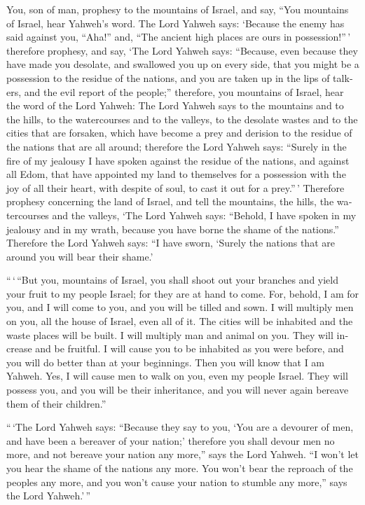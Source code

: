 \begin{paracol}{2}
\begin{otherlanguage}{english}
 You, son of man, prophesy to the mountains of Israel, and
say, ``You mountains of Israel, hear Yahweh's word.  The
Lord Yahweh says: `Because the enemy has said against you, ``Aha!'' and,
``The ancient high places are ours in possession!''\,' 
therefore prophesy, and say, `The Lord Yahweh says: ``Because, even
because they have made you desolate, and swallowed you up on every side,
that you might be a possession to the residue of the nations, and you
are taken up in the lips of talkers, and the evil report of the
people;''  therefore, you mountains of Israel, hear the
word of the Lord Yahweh: The Lord Yahweh says to the mountains and to
the hills, to the watercourses and to the valleys, to the desolate
wastes and to the cities that are forsaken, which have become a prey and
derision to the residue of the nations that are all around;
 therefore the Lord Yahweh says: ``Surely in the fire of
my jealousy I have spoken against the residue of the nations, and
against all Edom, that have appointed my land to themselves for a
possession with the joy of all their heart, with despite of soul, to
cast it out for a prey.''\,'  Therefore prophesy
concerning the land of Israel, and tell the mountains, the hills, the
watercourses and the valleys, `The Lord Yahweh says: ``Behold, I have
spoken in my jealousy and in my wrath, because you have borne the shame
of the nations.''  Therefore the Lord Yahweh says: ``I
have sworn, `Surely the nations that are around you will bear their
shame.'

 ``\,`\,``But you, mountains of Israel, you shall shoot
out your branches and yield your fruit to my people Israel; for they are
at hand to come.  For, behold, I am for you, and I will
come to you, and you will be tilled and sown.  I will
multiply men on you, all the house of Israel, even all of it. The cities
will be inhabited and the waste places will be built.  I
will multiply man and animal on you. They will increase and be fruitful.
I will cause you to be inhabited as you were before, and you will do
better than at your beginnings. Then you will know that I am Yahweh.
 Yes, I will cause men to walk on you, even my people
Israel. They will possess you, and you will be their inheritance, and
you will never again bereave them of their children.''

 ``\,`The Lord Yahweh says: ``Because they say to you,
`You are a devourer of men, and have been a bereaver of your nation;'
 therefore you shall devour men no more, and not bereave
your nation any more,'' says the Lord Yahweh.  ``I won't
let you hear the shame of the nations any more. You won't bear the
reproach of the peoples any more, and you won't cause your nation to
stumble any more,'' says the Lord Yahweh.'\,''


\end{otherlanguage}
\end{paracol}
